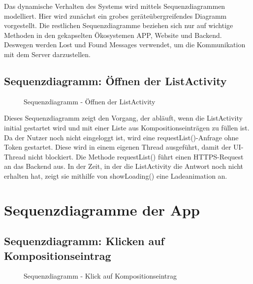 	Das dynamische Verhalten des Systems wird mittels Sequenzdiagrammen modelliert.
	Hier wird zunächst ein grobes geräteübergreifendes Diagramm vorgestellt.
	Die restlichen Sequenzdiagramme beziehen sich nur auf wichtige Methoden in den gekapselten Ökosystemen APP, Website und Backend. Deswegen werden Lost und Found Messages verwendet, um die Kommunikation mit dem Server darzustellen. 
	

\subsection*{Sequenzdiagramm: Öffnen der ListActivity}

\begin{figure}[h]
	\centering
	\caption{Sequenzdiagramm - Öffnen der ListActivity}
	\label{fig:sequenz-a}
\end{figure}
\noindent
Dieses Sequenzdiagramm zeigt den Vorgang, der abläuft, wenn die ListActivity initial gestartet wird und mit einer Liste aus Kompositionseinträgen zu füllen ist.
Da der Nutzer noch nicht eingeloggt ist, wird eine requestList()-Anfrage ohne Token gestartet. Diese wird in einem eigenen Thread ausgeführt, damit der UI-Thread nicht blockiert. Die Methode requestList() führt einen HTTPS-Request an das Backend aus. In der Zeit, in der die ListActivity die Antwort noch nicht erhalten hat, zeigt sie mithilfe von showLoading() eine Ladeanimation an.

\section*{Sequenzdiagramme der App}
\subsection*{Sequenzdiagramm: Klicken auf Kompositionseintrag}

\begin{figure}[h]
	\centering
	\caption{Sequenzdiagramm - Klick auf Kompositionseintrag}
	\label{fig:sequenz-a}
\end{figure}

